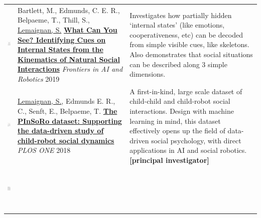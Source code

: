 \documentclass[11pt,a4paper]{report}
\begin{document}
\begin{tabular}{p{1.7cm}p{7cm}p{8cm}}
    \vspace{-.20cm}\includegraphics[height=2.2cm]{thumbs/2019-frontiers-maddy.jpg} &

    Bartlett, M., Edmunds, C. E. R., Belpaeme, T., Thill, S., \ul{Lemaignan, S.} 
    \href{https://doi.org/10.3389/frobt.2019.00049}{\textbf{What Can You See? Identifying Cues on Internal States from the
    Kinematics of Natural Social Interactions}} 
    \newline \textit{Frontiers in AI and Robotics} 2019
    & \small Investigates how partially hidden `internal states' (like emotions,
    cooperativeness, etc) can be decoded from simple visible cues, like
    skeletons. Also demonstrates that social situations can be described along 3
    simple dimensions.\textbf{}\\


    \vspace{-.20cm}\includegraphics[height=2.2cm]{thumbs/2018-plosone.jpg} &

    \ul{Lemaignan, S.}, Edmunds E. R., C., Senft, E., Belpaeme, T.
    \newline\href{https://doi.org/10.1371/journal.pone.0205999}{\textbf{The
    PInSoRo dataset: Supporting the data-driven study of child-robot social
    dynamics}}
    \newline \textit{PLOS ONE} 2018
    & \small A first-in-kind, large scale dataset of child-child and child-robot social interactions. Design
    with machine learning in mind, this dataset effectively opens up the field
    of data-driven social psychology, with direct applications in AI and social
    robotics.\textbf{[principal investigator]}\\

    \vspace{-.20cm}\includegraphics[height=2.2cm]{thumbs/2018-underworlds.jpg} &


\end{tabular}
\end{document}
